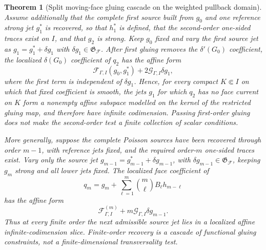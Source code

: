 \documentclass[11pt]{amsart}
\theoremstyle{compactplain}
\newtheorem{theorem}{Theorem}[section]
\theoremstyle{compactdefinition}
\theoremstyle{compactremark}
\begin{document}
\begin{theorem}[Split moving-face gluing cascade on the weighted pullback domain]
Assume additionally that the complete first source built from \(g_0\) and one
reference strong jet \(g_1^*\) is recovered, so that \(h_1^*\) is defined, that
the second-order one-sided traces exist on \(I\), and that \(g_2\) is strong.
Keep \(g_0\) fixed and vary the first source jet as
\(g_1=g_1^*+\delta g_1\) with
\(\delta g_1\in\mathfrak G_{\mathscr F}\).  After first gluing
removes the \(\delta'(G_0)\) coefficient, the localized \(\delta(G_0)\)
coefficient of \(q_2\) has the affine form
\begin{equation}
\label{eq:second_poisson_local_affine_gluing}
 \mathcal F_{\Gamma,I}(g_0,g_1^*)
 +2\mathcal G_{\Gamma,I}\delta g_1,
\end{equation}
where the first term is independent of \(\delta g_1\).  Hence, for every
compact \(K\Subset I\) on which that fixed coefficient is smooth, the jets
\(g_1\) for which \(q_2\) has no face current on \(K\) form a nonempty affine
subspace modelled on the kernel of the restricted gluing map, and therefore
have infinite codimension.  Passing first-order gluing does not make the
second-order test a finite collection of scalar conditions.

More generally, suppose the complete Poisson sources have been recovered
through order \(m-1\), with reference jets fixed, and the required order-\(m\)
one-sided traces exist.  Vary only the source jet
\(g_{m-1}=g_{m-1}^*+\delta g_{m-1}\), with
\(\delta g_{m-1}\in\mathfrak G_{\mathscr F}\), keeping \(g_m\) strong and all lower
jets fixed.  The localized face coefficient of
\[
 q_m=g_m+\sum_{\ell=1}^m\binom m\ell B_\ell h_{m-\ell}
\]
has the affine form
\begin{equation}
\label{eq:finite_order_local_affine_gluing}
 \mathcal F_{\Gamma,I}^{(m)}
 +m\mathcal G_{\Gamma,I}\delta g_{m-1}.
\end{equation}
Thus at every finite order the next admissible source jet lies in a localized
affine infinite-codimension slice.  Finite-order recovery is a cascade of
functional gluing constraints, not a finite-dimensional transversality test.
\end{theorem}
\end{document}
